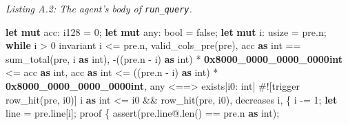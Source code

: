 \documentclass[
]{article}
\newenvironment{Shaded}{}{}
\newcommand{\AttributeTok}[1]{\textcolor[rgb]{0.49,0.56,0.16}{#1}}
\newcommand{\ConstantTok}[1]{\textcolor[rgb]{0.53,0.00,0.00}{#1}}
\newcommand{\ControlFlowTok}[1]{\textcolor[rgb]{0.00,0.44,0.13}{\textbf{#1}}}
\newcommand{\DataTypeTok}[1]{\textcolor[rgb]{0.56,0.13,0.00}{#1}}
\newcommand{\DecValTok}[1]{\textcolor[rgb]{0.25,0.63,0.44}{#1}}
\newcommand{\ErrorTok}[1]{\textcolor[rgb]{1.00,0.00,0.00}{\textbf{#1}}}
\newcommand{\KeywordTok}[1]{\textcolor[rgb]{0.00,0.44,0.13}{\textbf{#1}}}
\newcommand{\NormalTok}[1]{#1}
\newcommand{\OperatorTok}[1]{\textcolor[rgb]{0.40,0.40,0.40}{#1}}
\begin{document}
\emph{Listing A.2: The agent's body of \texttt{run\_query}.}

\begin{Shaded}
\begin{Highlighting}[]
    \KeywordTok{let} \KeywordTok{mut}\NormalTok{ acc}\OperatorTok{:} \DataTypeTok{i128} \OperatorTok{=} \DecValTok{0}\OperatorTok{;}
    \KeywordTok{let} \KeywordTok{mut}\NormalTok{ any}\OperatorTok{:} \DataTypeTok{bool} \OperatorTok{=} \ConstantTok{false}\OperatorTok{;}
    \KeywordTok{let} \KeywordTok{mut}\NormalTok{ i}\OperatorTok{:} \DataTypeTok{usize} \OperatorTok{=}\NormalTok{ pre}\OperatorTok{.}\NormalTok{n}\OperatorTok{;}
    \ControlFlowTok{while}\NormalTok{ i }\OperatorTok{\textgreater{}} \DecValTok{0}
\NormalTok{        invariant}
\NormalTok{            i }\OperatorTok{\textless{}=}\NormalTok{ pre}\OperatorTok{.}\NormalTok{n}\OperatorTok{,}
\NormalTok{            valid\_cols\_pre(pre)}\OperatorTok{,}
\NormalTok{            acc }\KeywordTok{as}\NormalTok{ int }\OperatorTok{==}\NormalTok{ sum\_total(pre}\OperatorTok{,}\NormalTok{ i }\KeywordTok{as}\NormalTok{ int)}\OperatorTok{,}
            \OperatorTok{{-}}\NormalTok{((pre}\OperatorTok{.}\NormalTok{n }\OperatorTok{{-}}\NormalTok{ i) }\KeywordTok{as}\NormalTok{ int) }\OperatorTok{*} \ErrorTok{0x8000\_0000\_0000\_0000int} \OperatorTok{\textless{}=}\NormalTok{ acc }\KeywordTok{as}\NormalTok{ int}\OperatorTok{,}
\NormalTok{            acc }\KeywordTok{as}\NormalTok{ int }\OperatorTok{\textless{}=}\NormalTok{ ((pre}\OperatorTok{.}\NormalTok{n }\OperatorTok{{-}}\NormalTok{ i) }\KeywordTok{as}\NormalTok{ int) }\OperatorTok{*} \ErrorTok{0x8000\_0000\_0000\_0000int}\OperatorTok{,}
\NormalTok{            any }\OperatorTok{\textless{}==\textgreater{}}\NormalTok{ exists}\OperatorTok{|}\NormalTok{i0}\OperatorTok{:}\NormalTok{ int}\OperatorTok{|} \AttributeTok{\#![}\NormalTok{trigger row\_hit}\AttributeTok{(}\NormalTok{pre}\OperatorTok{,}\NormalTok{ i0}\AttributeTok{)]}\NormalTok{ i }\KeywordTok{as}\NormalTok{ int }\OperatorTok{\textless{}=}\NormalTok{ i0 }\OperatorTok{\&\&}\NormalTok{ row\_hit(pre}\OperatorTok{,}\NormalTok{ i0)}\OperatorTok{,}
\NormalTok{        decreases i}\OperatorTok{,}
    \OperatorTok{\{}
\NormalTok{        i }\OperatorTok{{-}=} \DecValTok{1}\OperatorTok{;}
        \KeywordTok{let}\NormalTok{ line }\OperatorTok{=}\NormalTok{ pre}\OperatorTok{.}\NormalTok{line[i]}\OperatorTok{;}
\NormalTok{        proof }\OperatorTok{\{}
\NormalTok{            assert(pre}\OperatorTok{.}\NormalTok{line}\OperatorTok{@.}\NormalTok{len() }\OperatorTok{==}\NormalTok{ pre}\OperatorTok{.}\NormalTok{n }\KeywordTok{as}\NormalTok{ int)}\OperatorTok{;}

\end{Highlighting}
\end{Shaded}
\end{document}
